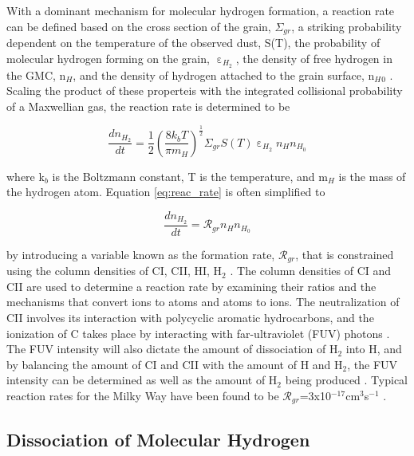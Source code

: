 
With a dominant mechanism for molecular hydrogen formation, a reaction rate can be defined based on the cross section of the grain, $\Sigma_{gr}$, a striking probability dependent on the temperature of the observed dust, S(T), the probability of molecular hydrogen forming on the grain, $\upepsilon_{H_2}$, the density of free hydrogen in the GMC, n$_H$, and the density of hydrogen attached to the grain surface, n$_H{_0}$ \citep{krumholz2014}.  Scaling the product of these properteis with the integrated collisional probability of a Maxwellian gas, the reaction rate is determined to be

\begin{equation}\label{eq:reac_rate}
  \frac{dn_{H_2}}{dt} = \frac{1}{2}\left(\frac{8k_bT}{\pi m_H}\right)^\frac{1}{2}\Sigma_{gr}S\left(T\right)\upepsilon_{H_2}n_{H}n_{H_0}
\end{equation}

\noindent where k$_b$ is the Boltzmann constant, T is the temperature, and m$_H$ is the mass of the hydrogen atom.  Equation \ref{eq:reac_rate} is often simplified to 

\begin{equation}\label{eq:reac_rate_sm}
  \frac{dn_{H_2}}{dt} = \mathcal{R}_{gr}n_H n_{H_0}
\end{equation}

\noindent by introducing a variable known as the formation rate, $\mathcal{R}_{gr}$, that is constrained using the column densities of CI, CII, HI, H$_2$ \citep{krumholz2014}.  The column densities of CI and CII are used to determine a reaction rate by examining their ratios and the mechanisms that convert ions to atoms and atoms to ions.  The neutralization of CII involves its interaction with polycyclic aromatic hydrocarbons, and the ionization of C takes place by interacting with far-ultraviolet (FUV) photons \citep{wolfire2008}.  The FUV intensity will also dictate the amount of dissociation of H$_2$ into H, and by balancing the amount of CI and CII with the amount of H and H$_2$, the FUV intensity can be determined as well as the amount of H$_2$ being produced \citep{wolfire2008}.  Typical reaction rates for the Milky Way have been found to be $\mathcal{R}_{gr}$=3x10$^{-17}$cm$^3$s$^{-1}$ \citep{jura1975, gry2002, wolfire2008}.

\subsection{Dissociation of Molecular Hydrogen}\label{h2destroy}

